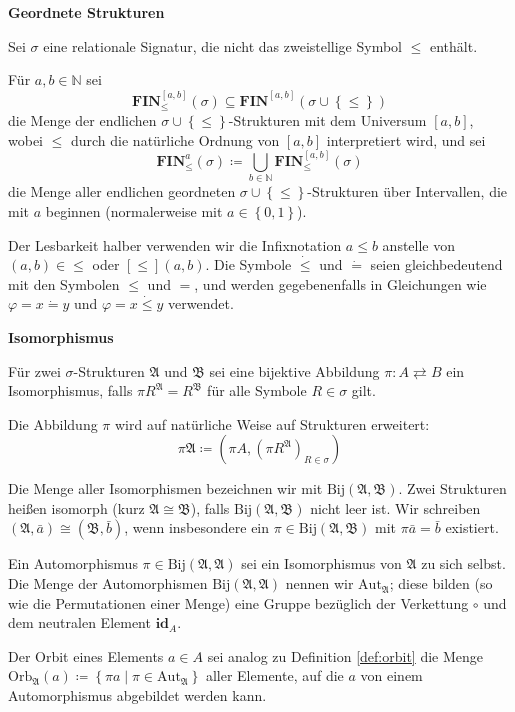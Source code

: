 \begin{defn}
\textbf{Geordnete Strukturen}

Sei $\sigma$ eine relationale Signatur, die nicht das zweistellige
Symbol $\leqslant$ enthält.

Für $a,b\in\mathbb{N}$ sei 
\[
\mathbf{FIN}_{\leqslant}^{\left[a,b\right]}\left(\sigma\right)\subseteq\mathbf{FIN}^{\left[a,b\right]}\left(\sigma\cup\left\{ \leqslant\right\} \right)
\]
 die Menge der endlichen $\sigma\cup\left\{ \leqslant\right\} $-Strukturen
mit dem Universum $\left[a,b\right]$, wobei $\leqslant$ durch die
natürliche Ordnung von $\left[a,b\right]$ interpretiert wird, und
sei 
\[
\mathbf{FIN}_{\leqslant}^{a}\left(\sigma\right)\coloneqq\bigcup_{b\in\mathbb{N}}\mathbf{FIN}_{\leqslant}^{\left[a,b\right]}\left(\sigma\right)
\]
 die Menge aller endlichen geordneten $\sigma\cup\left\{ \leqslant\right\} $-Strukturen
über Intervallen, die mit $a$ beginnen (normalerweise mit $a\in\left\{ 0,1\right\} $).
\end{defn}
Der Lesbarkeit halber verwenden wir die Infixnotation $a\leqslant b$
anstelle von $\left(a,b\right)\in\leqslant$ oder $\left[\leqslant\right]\left(a,b\right)$.
Die Symbole $\dot{\leqslant}$ und $\dot{=}$ seien gleichbedeutend
mit den Symbolen $\leqslant$ und $=$, und werden gegebenenfalls
in Gleichungen wie $\varphi=x\dot{=}y$ und $\varphi=x\dot{\leqslant}y$
verwendet.
\begin{defn}
\textbf{\label{def:isomorphism}Isomorphismus}

Für zwei $\sigma$-Strukturen $\mathfrak{A}$ und $\mathfrak{B}$
sei eine bijektive Abbildung $\pi:A\rightleftarrows B$ ein Isomorphismus,
falls $\pi R^{\mathfrak{A}}=R^{\mathfrak{B}}$ für alle Symbole $R\in\sigma$
gilt.

Die Abbildung $\pi$ wird auf natürliche Weise auf Strukturen erweitert:
\[
\pi\mathfrak{A}\coloneqq\left(\pi A,\left(\pi R^{\mathfrak{A}}\right)_{R\in\sigma}\right)
\]

Die Menge aller Isomorphismen bezeichnen wir mit $\mathrm{Bij}\left(\mathfrak{A},\mathfrak{B}\right)$.
Zwei Strukturen heißen isomorph (kurz $\mathfrak{A}\cong\mathfrak{B}$),
falls $\mathrm{Bij}\left(\mathfrak{A},\mathfrak{B}\right)$ nicht
leer ist. Wir schreiben $\left(\mathfrak{A},\bar{a}\right)\cong\left(\mathfrak{B},\bar{b}\right)$,
wenn insbesondere ein $\pi\in\mathrm{Bij}\left(\mathfrak{A},\mathfrak{B}\right)$
mit $\pi\bar{a}=\bar{b}$ existiert.

Ein Automorphismus $\pi\in\mathrm{Bij}\left(\mathfrak{A},\mathfrak{A}\right)$
sei ein Isomorphismus von $\mathfrak{A}$ zu sich selbst. Die Menge
der Automorphismen $\mathrm{Bij}\left(\mathfrak{A},\mathfrak{A}\right)$
nennen wir $\mathrm{Aut}_{\mathfrak{A}}$; diese bilden (so wie die
Permutationen einer Menge) eine Gruppe bezüglich der Verkettung $\circ$
und dem neutralen Element $\mathbf{id}_{A}$.

Der Orbit eines Elements $a\in A$ sei analog zu Definition \ref{def:orbit}
die Menge $\mathrm{Orb}_{\mathfrak{A}}\left(a\right)\coloneqq\left\{ \pi a\mid\pi\in\mathrm{Aut}_{\mathfrak{A}}\right\} $
aller Elemente, auf die $a$ von einem Automorphismus abgebildet werden
kann.
\end{defn}
